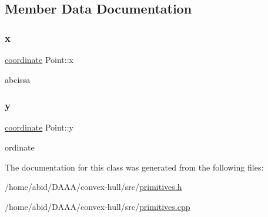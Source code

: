 \subsection{Member Data Documentation}
\mbox{\label{class_point_a2e5bf2da8d7f35ef2ca707ae5ec1929b}} 
\subsubsection{\texorpdfstring{x}{x}}
{\footnotesize\ttfamily \mbox{\hyperlink{primitives_8h_a9949b5198385a93773b854932cb22e08}{coordinate}} Point\+::x}

abcissa \mbox{\label{class_point_a4390d37c7ed19ad07212fc84df2fe26e}} 
\subsubsection{\texorpdfstring{y}{y}}
{\footnotesize\ttfamily \mbox{\hyperlink{primitives_8h_a9949b5198385a93773b854932cb22e08}{coordinate}} Point\+::y}

ordinate 

The documentation for this class was generated from the following files\+:\begin{DoxyCompactItemize}
\item 
/home/abid/\+D\+A\+A\+A/convex-\/hull/src/\mbox{\hyperlink{primitives_8h}{primitives.\+h}}\item 
/home/abid/\+D\+A\+A\+A/convex-\/hull/src/\mbox{\hyperlink{primitives_8cpp}{primitives.\+cpp}}\end{DoxyCompactItemize}
